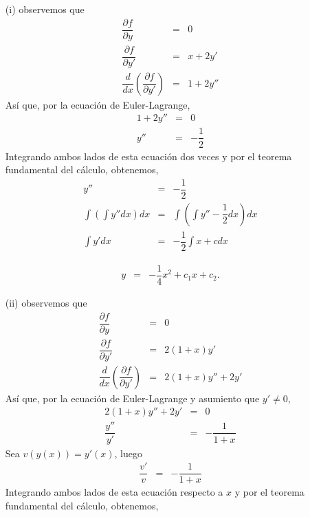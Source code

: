 \documentclass[11pt,letterpaper]{article}
\theoremstyle{definition}
\theoremstyle{definition}
\theoremstyle{definition}
\begin{document}
\begin{itemize}
	\item[(i)] observemos que
	\begin{eqnarray*}
		\dfrac{\partial f}{\partial y}  & = & 0 \\
		\dfrac{\partial f}{\partial y'} & = & x + 2 y' \\
		\dfrac{d}{dx}\left( \dfrac{\partial f}{\partial y'} \right) & = & 1 + 2 y''
	\end{eqnarray*}
	Así que, por la ecuación de Euler-Lagrange,
	\begin{eqnarray*}
		1 + 2 y'' & = & 0 \\
			  y'' & = & -\dfrac{1}{2} 
	\end{eqnarray*}
	Integrando ambos lados de esta ecuación dos veces y por el teorema fundamental del cálculo, obtenemos,
		\begin{eqnarray*}
		y''         & = & -\dfrac{1}{2} \\
		\int \left(\int y'' dx\right) dx  & = & \int \left(\int y'' -\dfrac{1}{2} dx\right) dx \\
		\int y' dx  & = & -\dfrac{1}{2} \int x + c dx
	\end{eqnarray*}
	\begin{shaded*}
		\begin{eqnarray*}
			y  & = & -\dfrac{1}{4} x^2 + c_1x + c_2 .
		\end{eqnarray*}
	\end{shaded*}
	\item[(ii)] observemos que
	\begin{eqnarray*}
		\dfrac{\partial f}{\partial y}  & = & 0 \\
		\dfrac{\partial f}{\partial y'} & = & 2(1+x) y' \\
		\dfrac{d}{dx}\left( \dfrac{\partial f}{\partial y'} \right) & = & 2(1+x) y'' + 2 y' 
	\end{eqnarray*}
	Así que, por la ecuación de Euler-Lagrange y asumiento que $ y' \neq 0 $,
	\begin{eqnarray*}
		2(1+x) y'' + 2 y'  & = & 0 \\
		\dfrac{y''}{y'} & = & -\dfrac{1}{1+x} 
	\end{eqnarray*}
	Sea $ v(y(x)) = y'(x) $, luego
	\begin{eqnarray*}
		\dfrac{v'}{v} & = & -\dfrac{1}{1+x} 
	\end{eqnarray*}
	Integrando ambos lados de esta ecuación respecto a $ x $ y por el teorema fundamental del cálculo, obtenemos,
	\begin{eqnarray*}

\end{eqnarray*}
\end{itemize}
\end{document}
